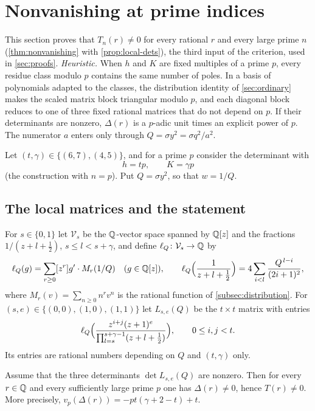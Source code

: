 \section{Nonvanishing at prime indices}\label{sec:nonvanishing}

This section proves that $T_n(r)\ne0$ for every rational $r$ and every large prime $n$
(\cref{thm:nonvanishing} with \cref{prop:local-dets}), the third input of the criterion, used in
\cref{sec:proofs}. \emph{Heuristic.} When $h$ and $K$ are fixed multiples of a prime $p$, every
residue class modulo $p$ contains the same number of poles. In a basis of polynomials adapted to the
classes, the distribution identity of \cref{sec:ordinary} makes the scaled matrix block triangular
modulo $p$, and each diagonal block reduces to one of three fixed rational matrices that do not
depend on $p$. If their determinants are nonzero, $\Delta(r)$ is a $p$-adic unit times an explicit
power of $p$. The numerator $a$ enters only through $Q=\sigma y^2=\sigma q^2/a^2$.

Let $(t,\gamma)\in\{(6,7),(4,5)\}$, and for a prime $p$ consider the determinant with
\[
  h=tp,\qquad K=\gamma p
\]
(the construction with $n=p$). Put $Q=\sigma y^2$, so that $w=1/Q$.

\subsection{The local matrices and the statement}\label{subsec:local-matrices}

For $s\in\{0,1\}$ let $\mathcal V_s$ be the $\mathbb{Q}$-vector space spanned by $\mathbb{Q}[z]$ and the
fractions $1/(z+l+\frac12)$, $s\le l<s+\gamma$, and define $\ell_Q\colon\mathcal V_s\to\mathbb{Q}$ by
\begin{equation}\label{eq:ellQ}
  \ell_Q(g)=\sum_{r\ge0}[z^r]g'\cdot M_r(1/Q)\quad(g\in\mathbb{Q}[z]),\qquad
  \ell_Q\Bigl(\frac1{z+l+\frac12}\Bigr)=4\sum_{i<l}\frac{Q^{\,l-i}}{(2i+1)^2},
\end{equation}
where $M_r(v)=\sum_{n\ge0}n^rv^n$ is the rational function of \cref{subsec:distribution}. For
$(s,e)\in\{(0,0),(1,0),(1,1)\}$ let $L_{s,e}(Q)$ be the $t\times t$ matrix with entries
\[
  \ell_Q\Bigl(\frac{z^{i+j}(z+1)^e}{\prod_{l=s}^{s+\gamma-1}(z+l+\frac12)}\Bigr),\qquad 0\le i,j<t .
\]
Its entries are rational numbers depending on $Q$ and $(t,\gamma)$ only.

\begin{theorem}\label{thm:nonvanishing}
Assume that the three determinants $\det L_{s,e}(Q)$ are nonzero. Then for every $r\in\mathbb{Q}$ and
every sufficiently large prime $p$ one has $\Delta(r)\ne0$, hence $T(r)\ne0$. More precisely,
$v_p(\Delta(r))=-pt(\gamma+2-t)+t$.
\end{theorem}

